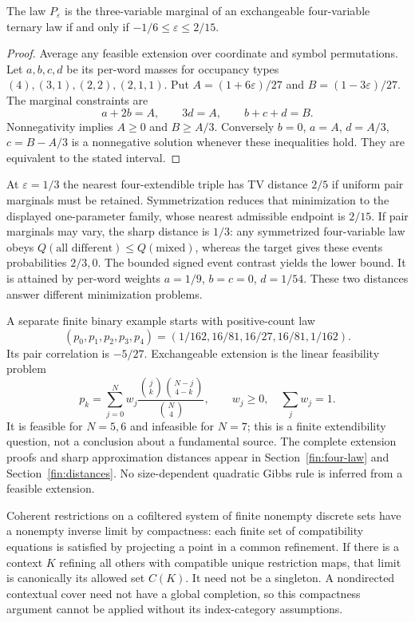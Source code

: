 \begin{proposition}
The law $P_\varepsilon$ is the three-variable marginal of an exchangeable four-variable ternary law if and only if $-1/6\le\varepsilon\le2/15$.
\end{proposition}
\begin{proof}
Average any feasible extension over coordinate and symbol permutations. Let $a,b,c,d$ be its per-word masses for occupancy types $(4),(3,1),(2,2),(2,1,1)$. Put $A=(1+6\varepsilon)/27$ and $B=(1-3\varepsilon)/27$. The marginal constraints are
\[
 a+2b=A,\qquad3d=A,\qquad b+c+d=B.
\]
Nonnegativity implies $A\ge0$ and $B\ge A/3$. Conversely $b=0$, $a=A$, $d=A/3$, $c=B-A/3$ is a nonnegative solution whenever these inequalities hold. They are equivalent to the stated interval.
\end{proof}
At $\varepsilon=1/3$ the nearest four-extendible triple has TV distance $2/5$ if uniform pair marginals must be retained. Symmetrization reduces that minimization to the displayed one-parameter family, whose nearest admissible endpoint is $2/15$. If pair marginals may vary, the sharp distance is $1/3$: any symmetrized four-variable law obeys $Q(\text{all different})\le Q(\text{mixed})$, whereas the target gives these events probabilities $2/3,0$. The bounded signed event contrast yields the lower bound. It is attained by per-word weights $a=1/9$, $b=c=0$, $d=1/54$. These two distances answer different minimization problems.

A separate finite binary example starts with positive-count law
\[
 (p_0,p_1,p_2,p_3,p_4)=(1/162,16/81,16/27,16/81,1/162).
\]
Its pair correlation is $-5/27$. Exchangeable extension is the linear feasibility problem
\[
 p_k=\sum_{j=0}^N w_j\frac{\binom jk\binom{N-j}{4-k}}{\binom N4},
 \qquad w_j\ge0,\quad\sum_jw_j=1.
\]
It is feasible for $N=5,6$ and infeasible for $N=7$; this is a finite extendibility question, not a conclusion about a fundamental source. The complete extension proofs and sharp approximation distances appear in Section~\ref{fin:four-law} and Section~\ref{fin:distances}. No size-dependent quadratic Gibbs rule is inferred from a feasible extension.

Coherent restrictions on a cofiltered system of finite nonempty discrete sets have a nonempty inverse limit by compactness: each finite set of compatibility equations is satisfied by projecting a point in a common refinement. If there is a context $K$ refining all others with compatible unique restriction maps, that limit is canonically its allowed set $C(K)$. It need not be a singleton. A nondirected contextual cover need not have a global completion, so this compactness argument cannot be applied without its index-category assumptions.


